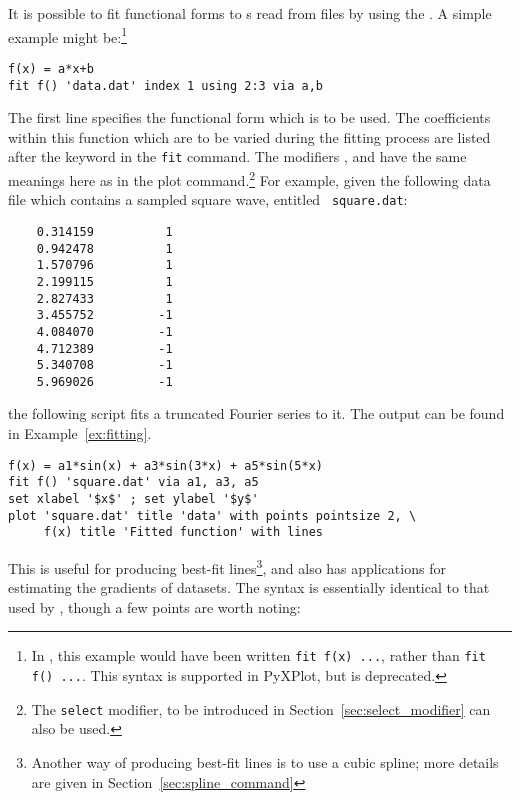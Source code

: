 It is possible to fit functional forms to \datapoint s read from files by using
the . A simple example might be:\footnote{In \gnuplot, this
example would have been written {\tt fit f(x) ...}, rather than {\tt fit f()
...}. This syntax is supported in PyXPlot, but is deprecated.}

\begin{verbatim}
f(x) = a*x+b
fit f() 'data.dat' index 1 using 2:3 via a,b
\end{verbatim}

The first line specifies the functional form which is to be used.  The
coefficients within this function which are to be varied during the fitting
process are listed after the keyword  in the {\tt fit} command.
The modifiers ,  and
 have the same meanings here as in the plot
command.\footnote{The {\tt select} modifier, to be introduced in
Section~\ref{sec:select_modifier} can also be used.}  For example, given the
following data file which contains a sampled square wave, entitled {\tt
square.dat}:

\begin{verbatim}
    0.314159          1
    0.942478          1
    1.570796          1
    2.199115          1
    2.827433          1
    3.455752         -1
    4.084070         -1
    4.712389         -1
    5.340708         -1
    5.969026         -1
\end{verbatim}

\noindent the following script fits a truncated Fourier series to it.  The
output can be found in Example~\ref{ex:fitting}.

\begin{verbatim}
f(x) = a1*sin(x) + a3*sin(3*x) + a5*sin(5*x)
fit f() 'square.dat' via a1, a3, a5
set xlabel '$x$' ; set ylabel '$y$'
plot 'square.dat' title 'data' with points pointsize 2, \
     f(x) title 'Fitted function' with lines
\end{verbatim}


This is useful for producing best-fit lines\footnote{Another way of producing best-fit lines is to use a cubic
spline; more details are given in Section~\ref{sec:spline_command}}, and also has
applications for estimating the gradients of datasets.  The syntax is
essentially identical to that used by \gnuplot, though a few points are worth
noting:

